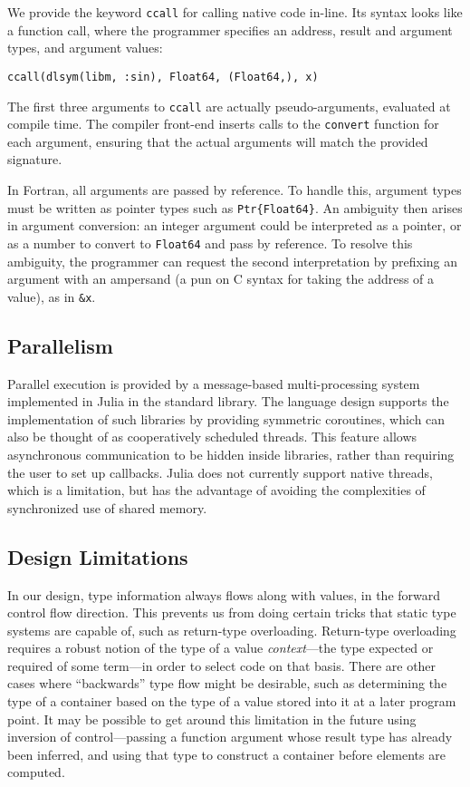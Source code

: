 \documentclass[9pt]{sigplanconf}
\begin{document}
We provide the keyword {\tt ccall} for calling native code in-line.
Its syntax looks like a function call, where the programmer specifies
an address, result and argument types, and argument values:

\begin{verbatim}
ccall(dlsym(libm, :sin), Float64, (Float64,), x)
\end{verbatim}

The first three arguments to {\tt ccall} are actually pseudo-arguments,
evaluated at compile time. The compiler front-end inserts calls to the
{\tt convert} function for each argument, ensuring that the actual arguments
will match the provided signature.

In Fortran, all arguments are passed by reference. To handle this,
argument types must be written as pointer types such as
{\tt Ptr\{Float64\}}. An ambiguity then arises in argument conversion:
an integer argument could be interpreted as a pointer, or as a number
to convert to {\tt Float64} and pass by reference. To resolve this
ambiguity, the programmer can request the second interpretation by
prefixing an argument with an ampersand (a pun on C syntax for taking the
address of a value), as in {\tt \&x}.

\subsection{Parallelism}

Parallel execution is provided by a message-based multi-processing
system implemented in Julia in the standard library.
The language design supports the implementation of such libraries by
providing symmetric coroutines, which can also be thought of as
cooperatively scheduled threads. This feature allows asynchronous
communication to be hidden inside libraries, rather than requiring the
user to set up callbacks. Julia does not currently support
native threads, which is a limitation, but has the advantage of avoiding
the complexities of synchronized use of shared memory.

\subsection{Design Limitations}

In our design, type information always flows along with values, in the
forward control flow direction. This prevents us from doing certain tricks
that static type systems are capable of, such as return-type overloading.
Return-type overloading requires a robust notion of the type of a value
\emph{context}---the type expected or required of some term---in order to
select code on that basis. There are other cases where ``backwards'' type
flow might be desirable, such as determining the type of a container based
on the type of a value stored into it at a later program point. It may be
possible to get around this limitation in the future using inversion of
control---passing a function argument whose result type has already been
inferred, and using that type to construct a container before elements are
computed.
\end{document}
